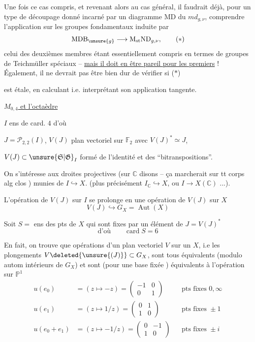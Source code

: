 Une fois ce cas compris, et revenant alors au cas général, il faudrait déjà, pour un type de découpage donné incarné par un diagramme $\mathrm{MD}$ du $md_{g,\nu}$, comprendre l'application sur les groupes fondamentaux induite par
\[
\mathrm{MDB}_{\unsure{g}}\longrightarrow \mathrm M_{\mathrm{st}}\mathrm{ND}_{g,\nu}, \tag*{($*$)}
\]
celui des deuxièmes membres étant essentiellement compris en termes de groupes de Teichmüller spéciaux -- \uline{mais il doit en être pareil pour les premiers} ! Également, il ne devrait pas être bien dur de vérifier si ($*$)

est étale, en calculant i.e. interprétant son application tangente.

\uline{ $M_{0,4}$ et l'octaèdre}

$I$ ens de card. $4$ d'où

$J=\mathscr P_{2,2}(I)$, $V(J)$ plan vectoriel sur $\mathbb F_2$ avec $V(J)^*\simeq J$,

$V(J)\subset\unsure{\mathfrak S|\mathfrak G}_I$ formé de l'identité et des ``bitranspositions''.

On s'intéresse aux droites projectives (sur $\mathbb C$ disons -- ça marcherait sur tt corps alg clos ) munies de $I\hookrightarrow X$. (plus précisément $I_{\mathbb C}\hookrightarrow X$, ou $I\to X(\mathbb C)$ ...).

L'opération de $V(J)$ sur $I$ se prolonge en une opération de $V(J)$ sur $X$
\[
V(J)\hookrightarrow G_X=\operatorname{Aut}(X)
\]

Soit \qquad $S=$ ens des pts de $X$ qui sont fixes par un élément de $J=V(J)^*$
\[
\text{d'où}\qquad \operatorname{card} S=6
\]

En fait, on trouve que   opérations   d'un plan vectoriel $V$ sur un $X$, i.e les plongements $V\deleted{\unsure{(J)}}\subset G_X$, sont tous équivalents (modulo autom intérieurs de $G_X$) et sont (pour une base fixée ) équivalents à l'opération sur $\mathbb P^1$
\[
\begin{aligned}
u(e_0)&=(z\longmapsto-z)=\begin{pmatrix}-1&0\\0&1\end{pmatrix}&&\text{pts fixes }0,\infty\\
u(e_1)&=(z\longmapsto1/z)=\begin{pmatrix}0&1\\1&0\end{pmatrix}&&\text{pts fixes }\pm1\\
u(e_0+e_1)&=(z\longmapsto-1/z)=\begin{pmatrix}0&-1\\1&0\end{pmatrix}&&\text{pts fixes }\pm i
\end{aligned}
\]

